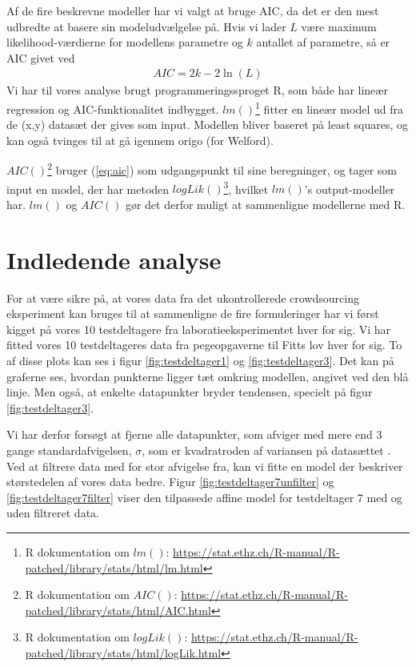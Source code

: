 Af de fire beskrevne modeller har vi valgt at bruge AIC, da det er den mest udbredte at basere sin modeludvælgelse på. Hvis vi lader $L$ være maximum likelihood-værdierne for modellens parametre og $k$ antallet af parametre, så er AIC givet ved
\begin{align}
AIC = 2k - 2\ln(L) \label{eq:aic}
\end{align}
Vi har til vores analyse brugt programmeringssproget R, som både har lineær regression og AIC-funktionalitet indbygget. $lm()$\footnote{R dokumentation om $lm()$: \url{https://stat.ethz.ch/R-manual/R-patched/library/stats/html/lm.html}} fitter en lineær model ud fra de (x,y) datasæt der gives som input. Modellen bliver baseret på least squares, og kan også tvinges til at gå igennem origo (for Welford).

$AIC()$\footnote{R dokumentation om $AIC()$: \url{https://stat.ethz.ch/R-manual/R-patched/library/stats/html/AIC.html}} bruger (\ref{eq:aic}) som udgangspunkt til sine beregninger, og tager som input en model, der har metoden $logLik()$\footnote{R dokumentation om $logLik()$: \url{https://stat.ethz.ch/R-manual/R-patched/library/stats/html/logLik.html}}, hvilket $lm()$'s output-modeller har. $lm()$ og $AIC()$ gør det derfor muligt at sammenligne modellerne med R.

\section*{Indledende analyse}
For at være sikre på, at vores data fra det ukontrollerede crowdsourcing eksperiment kan bruges til at sammenligne de fire formuleringer har vi først kigget på vores 10 testdeltagere fra laboratieeksperimentet hver for sig. Vi har fitted vores 10 testdeltageres data fra pegeopgaverne til Fitts lov hver for sig. To af disse plots kan ses i figur \ref{fig:testdeltager1} og \ref{fig:testdeltager3}.  Det kan på graferne ses, hvordan punkterne ligger tæt omkring modellen, angivet ved den blå linje. Men også, at enkelte datapunkter bryder tendensen, specielt på figur \ref{fig:testdeltager3}.

Vi har derfor forsøgt at fjerne alle datapunkter, som afviger med mere end 3 gange standardafvigelsen, $\sigma$, som er kvadratroden af variansen på datasættet \cite{pearson1894}. Ved at filtrere data med for stor afvigelse fra, kan vi fitte en model der beskriver størstedelen af vores data bedre. Figur \ref{fig:testdeltager7unfilter} og \ref{fig:testdeltager7filter} viser den tilpassede affine model for testdeltager 7 med og uden filtreret data.

